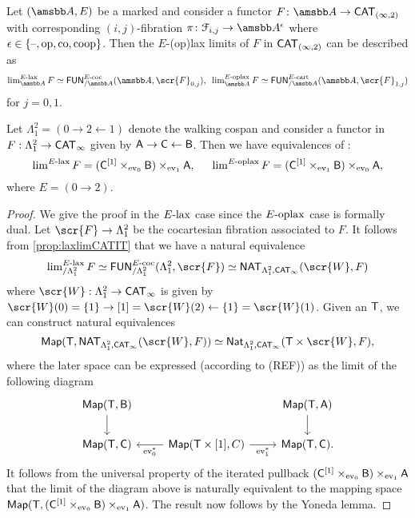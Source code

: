\documentclass[10pt,a4paper]{amsart}
\begin{document}
\begin{propn}\label{prop:laxlimCATIT}
  Let $(\tA,E)$ be a marked \itcat{} and consider a functor $F \colon\tc{A} \to \CATIT$ with corresponding  $(i,j)$-fibration  $\pi \colon\mathcal{F}_{i,j} \to \tc{A}^{\epsilon}$ where $\epsilon\in\{\text{\textendash},\text{\textup{op}},\text{\textup{co}},\text{\textup{coop}}\}$. Then the $E$-(op)lax limits of $F$ in $\textup{\textmd{\textsf{CAT}}}_{(\infty,2)}$ can be described as
  \[
    \lim^{\elax}_{\tc{A}}F \simeq \FUN^{E\dcoc}_{/\tc{A}}(\tc{A},\scr{F}_{0,j}), \enspace \lim^{\eoplax}_{\tc{A}}F \simeq \FUN^{E\dcart}_{/\tc{A}}(\tc{A},\scr{F}_{1,j})
  \]
  for $j = 0,1$.
\end{propn}

\begin{propn}\label{prop:arrow}
  Let $\Lambda^2_1=(0 \to 2 \leftarrow 1)$ denote the walking cospan and consider a functor in $F: \Lambda^2_1 \to \textup{\textmd{\textsf{CAT}}}_{\infty}$ given by $\mathsf{A} \to \mathsf{C} \leftarrow \mathsf{B}$. Then we have equivalences of \icats:
  \[
    \operatorname{lim}^{E\text{\textup{-lax}}}F = (\mathsf{C}^{[1]}\times_{\text{\textup{ev}}_0} \mathsf{B})\times_{\text{\textup{ev}}_1} \mathsf{A}, \enspace \enspace \enspace \operatorname{lim}^{E\text{\textup{-oplax}}}F = (\mathsf{C}^{[1]}\times_{\text{\textup{ev}}_1} \mathsf{B})\times_{\text{\textup{ev}}_0} \mathsf{A},
  \]
  where $E=(0 \to 2)$.
\end{propn}
\begin{proof}
  We give the proof in the $E\text{\textup{-lax}}$ case since the $E\text{\textup{-oplax}}$ case is formally dual. Let $\scr{F} \to \Lambda^2_1$ be the cocartesian fibration associated to $F$. It follows from \cref{prop:laxlimCATIT} that we have a natural equivalence 
  \[
      \lim^{\elax}_{/\Lambda^2_1}F \simeq \FUN^{E\dcoc}_{/\Lambda^2_1}(\Lambda^2_1,\scr{F}) \simeq \NAT_{\Lambda^2_1,\CATI}(\scr{W},F)
   \] 
   where $\scr{W}:\Lambda^2_1 \to \CATI$ is given by $\scr{W}(0)=\{1\} \to [1]=\scr{W}(2) \leftarrow \{1\}=\scr{W}(1)$. Given an \itcat{} $\mathsf{T}$, we can construct natural equivalences
   \[
     \Map(\oT,\NAT_{\Lambda^2_1,\CATI}(\scr{W},F))\simeq \Nat_{\Lambda^2_1,\CATI}(\oT \times \scr{W},F),
   \]
   where the later space can be expressed (according to (REF)) as the limit of the following diagram
   \[
     \begin{tikzcd}
       \Map(\oT,\oB) \arrow[d] & & \Map(\oT,\oA) \arrow[d] \\
       \Map(\oT,\oC)  & \arrow[l,"\ev^*_{0}"] \Map(\oT\times{[}1{]},C) \arrow[r,swap,"\ev^*_1"]& \Map(\oT,\oC).
     \end{tikzcd}
   \]
   It follows from the universal property of the iterated pullback $ (\mathsf{C}^{[1]}\times_{\text{\textup{ev}}_0} \mathsf{B})\times_{\text{\textup{ev}}_1} \mathsf{A}$ that the limit of the diagram above is naturally equivalent  to the mapping space $\textup{\textmd{\textsf{Map}}}(\mathsf{T}, (\mathsf{C}^{[1]}\times_{\text{\textup{ev}}_0} \mathsf{B})\times_{\text{\textup{ev}}_1} \mathsf{A})$. The result now follows by the Yoneda lemma.
  
\end{proof}
\end{document}
